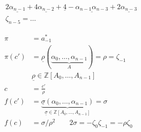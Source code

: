 \[
\begin{aligned}
&2\underline{\alpha_{n-1}}+4\underline{\alpha_{n-2}}+\underline{4}-\underline{\alpha_{n-1}\alpha_{n-3}}+2\underline{\alpha_{n-3}}\\
&\zeta_{n-5}=\ldots
\end{aligned}
\]

\[
\begin{aligned}
\pi&=a_{-1}^*\\
\pi(c')&=\underline{\rho}(\underbrace{\alpha_0,\ldots,\alpha_{n-1}}_{A})=\rho=\zeta_{-1}\\
&\underline{\rho}\in\mathbb Z[A_0,\ldots,A_{n-1}]\\
c&=\frac{c'}{\rho}\\
f(c')&=\underbrace{\underline\sigma(\alpha_0,\ldots,\alpha_{n-1})}_{\underline\sigma\in\mathbb Z[A_0,\ldots,A_{n-1}]}=\sigma\\
f(c)&=\sigma/\rho^2\qquad 2\sigma=-\zeta_0\zeta_{-1}=-\rho\zeta_0
\end{aligned}
\]

